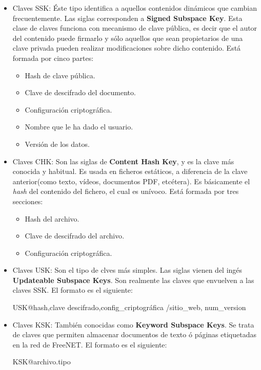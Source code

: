 \begin{itemize}
	\item {Claves SSK}: Éste tipo identifica a aquellos contenidos dinámicos que cambian frecuentemente. Las siglas corresponden a \textbf{Signed Subspace Key}. Esta clase de claves funciona con mecanismo de clave pública, es decir que el autor del contenido puede firmarlo y sólo aquellos que sean propietarios de una clave privada pueden realizar modificaciones sobre dicho contenido. Está formada por cinco partes:
	\begin{itemize}
		\item {Hash de clave pública}.
		\item {Clave de descifrado del documento}.
		\item {Configuración criptográfica}.
		\item {Nombre que le ha dado el usuario}.
		\item {Versión de los datos}.
	\end{itemize}
	\item {Claves CHK}: Son las siglas de \textbf{Content Hash Key}, y es la clave más conocida y habitual. Es usada en ficheros estáticos, a diferencia de la clave anterior(como texto, vídeos, documentos PDF, etcétera). Es básicamente el \textit{hash} del contenido del fichero, el cual es unívoco. Está formada por tres secciones:
	\begin{itemize}
		\item {Hash del archivo}.
		\item {Clave de descifrado del archivo}.
		\item {Configuración criptográfica}.
	\end{itemize}
	\item {Claves USK}: Son el tipo de clves más simples. Las siglas vienen del ingés \textbf{Updateable Subspace Keys}. Son realmente las claves que envuelven a las claves SSK. El formato es el siguiente:
	
	{\selectfont 
		USK@hash,clave	descifrado,config\_criptográfica /sitio\_web, num\_version
	}
	
	\item {Claves KSK}: También conocidas como \textbf{Keyword Subspace Keys}. Se trata de claves que permiten almacenar documentos de texto ó páginas etiquetadas en la red de FreeNET.
	El formato es el siguiente: 
	
	{\selectfont 
		KSK@archivo.tipo
	}
\end{itemize}


